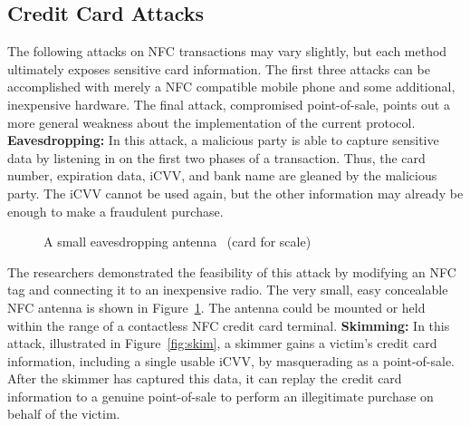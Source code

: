 \documentclass{sig-alternate}
\begin{document}
\subsection{Credit Card Attacks}
\label{sec:attacks}
The following attacks on NFC transactions may vary slightly, but each method ultimately exposes sensitive card information. The first three attacks can be accomplished with merely a NFC compatible mobile phone and some additional, inexpensive hardware. The final attack, compromised point-of-sale, points out a more general weakness about the implementation of the current protocol.
\vspace{2mm}\newline
\noindent\textbf{Eavesdropping:}
In this attack, a malicious party is able to capture sensitive data by listening in on the first two phases of a transaction. Thus, the card number, expiration data, iCVV, and bank name are gleaned by the malicious party. The iCVV cannot be used again, but the other information may already be enough to make a fraudulent purchase.

\begin{figure}
\centering
{}
\caption{A small eavesdropping antenna~\cite{CC2016} (card for scale)}
\label{fig:antenna}
\end{figure}

The researchers demonstrated the feasibility of this attack by modifying an NFC tag and connecting it to an inexpensive radio. The very small, easy concealable NFC antenna is shown in Figure~\ref{fig:antenna}. The antenna could be mounted or held within the range of a contactless NFC credit card terminal.
\vspace{2mm}\newline
\noindent\textbf{Skimming:}
In this attack, illustrated in Figure~\ref{fig:skim}, a skimmer gains a victim's credit card information, including a single usable iCVV, by masquerading as a point-of-sale. After the skimmer has captured this data, it can replay the credit card information to a genuine point-of-sale to perform an illegitimate purchase on behalf of the victim.
\end{document}
